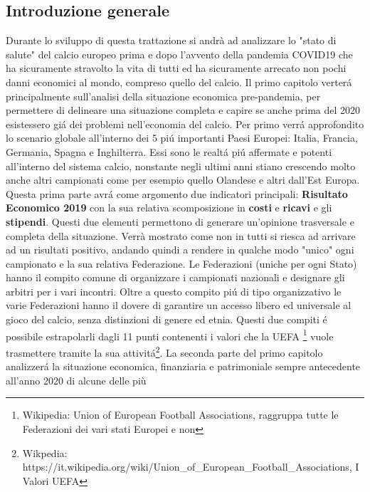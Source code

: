 \documentclass[
    corpo=12pt,
    oneside,
    evenboxes,
    tipotesi=triennale,
    stile=classica,
    oldstyle,
    autoretitolo,
    greek,
]{toptesi}
\begin{document}
\begin{interlinea}{1.5}
    
\chapter{Introduzione generale}
Durante lo sviluppo di questa trattazione si andrà ad analizzare lo "stato di salute" del calcio europeo prima e dopo 
l'avvento della pandemia COVID19 che ha sicuramente stravolto la vita di tutti ed ha sicuramente arrecato non pochi danni 
economici al mondo, compreso quello del calcio.\newline
Il primo capitolo verter\'a principalmente sull'analisi della situazione economica pre-pandemia, per permettere di delineare una situazione
completa e capire se anche prima del 2020 esistessero gi\'a dei problemi nell'economia del calcio. Per primo verr\'a approfondito lo scenario
globale all'interno dei 5 pi\'u importanti Paesi Europei: Italia, Francia, Germania, Spagna e Inghilterra. Essi sono le realt\'a pi\'u 
affermate e potenti all'interno del sistema calcio, nonstante negli ultimi anni stiano crescendo molto anche altri campionati come per esempio
quello Olandese e altri dall'Est Europa. Questa prima parte avr\'a come argomento due indicatori principali: \textbf{Risultato Economico 2019} 
con la sua relativa scomposizione in \textbf{costi} e \textbf{ricavi} e gli \textbf{stipendi}. Questi due elementi
permettono di generare un'opinione trasversale e completa della situazione. Verrà mostrato come non in tutti 
si riesca ad arrivare ad un risultati positivo, andando quindi a rendere in qualche modo 
"unico" ogni campionato e la sua relativa Federazione. Le Federazioni (uniche per ogni Stato) hanno il compito
comune di organizzare i campionati nazionali e designare gli arbitri per i vari incontri. Oltre a questo compito pi\'u di tipo
organizzativo le varie Federazioni hanno il dovere di garantire un accesso libero ed universale al gioco del calcio, senza distinzioni
di genere ed etnia. Questi due compiti \'e possibile estrapolarli dagli 11 punti contenenti i valori che la UEFA
\footnote{Wikipedia: Union of European Football Associations, raggruppa tutte le Federazioni dei vari stati Europei e non} vuole
trasmettere tramite la sua attivit\'a\footnote{Wikpedia: https://it.wikipedia.org/wiki/Union\_of\_European\_Football\_Associations, I Valori UEFA}.\newline
La seconda parte del primo capitolo analizzer\'a la situazione economica, finanziaria e patrimoniale sempre antecedente all'anno 2020 di alcune delle più 

\end{interlinea}
\end{document}
